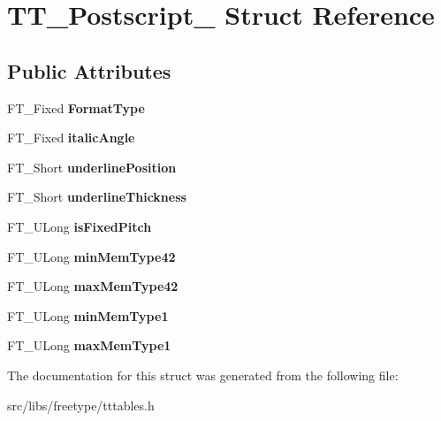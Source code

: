 \hypertarget{struct_t_t___postscript__}{
\section{TT\_\-Postscript\_\- Struct Reference}
\label{struct_t_t___postscript__}
}
\subsection*{Public Attributes}
\begin{DoxyCompactItemize}
\item 
\hypertarget{struct_t_t___postscript___a5ed6585c01fa4ffc3f8537d58bdd955f}{
FT\_\-Fixed {\bfseries FormatType}}
\label{struct_t_t___postscript___a5ed6585c01fa4ffc3f8537d58bdd955f}

\item 
\hypertarget{struct_t_t___postscript___adcca36c7fbcbdff00fc8c2884a215830}{
FT\_\-Fixed {\bfseries italicAngle}}
\label{struct_t_t___postscript___adcca36c7fbcbdff00fc8c2884a215830}

\item 
\hypertarget{struct_t_t___postscript___a909fd5064ab7547bb8ed984b5dfe2fe2}{
FT\_\-Short {\bfseries underlinePosition}}
\label{struct_t_t___postscript___a909fd5064ab7547bb8ed984b5dfe2fe2}

\item 
\hypertarget{struct_t_t___postscript___a4e4654766a4f27054c9a35958515e186}{
FT\_\-Short {\bfseries underlineThickness}}
\label{struct_t_t___postscript___a4e4654766a4f27054c9a35958515e186}

\item 
\hypertarget{struct_t_t___postscript___ab9a537994be4f81cb35f61f83cd97949}{
FT\_\-ULong {\bfseries isFixedPitch}}
\label{struct_t_t___postscript___ab9a537994be4f81cb35f61f83cd97949}

\item 
\hypertarget{struct_t_t___postscript___ad78af4931654c197d4a8d0f04d473885}{
FT\_\-ULong {\bfseries minMemType42}}
\label{struct_t_t___postscript___ad78af4931654c197d4a8d0f04d473885}

\item 
\hypertarget{struct_t_t___postscript___a70c4ba372d04e686208f0fede9885314}{
FT\_\-ULong {\bfseries maxMemType42}}
\label{struct_t_t___postscript___a70c4ba372d04e686208f0fede9885314}

\item 
\hypertarget{struct_t_t___postscript___a91a8b40f60e67a1920209e6b08355848}{
FT\_\-ULong {\bfseries minMemType1}}
\label{struct_t_t___postscript___a91a8b40f60e67a1920209e6b08355848}

\item 
\hypertarget{struct_t_t___postscript___a944a3df5127262db0f7ae92868defb99}{
FT\_\-ULong {\bfseries maxMemType1}}
\label{struct_t_t___postscript___a944a3df5127262db0f7ae92868defb99}

\end{DoxyCompactItemize}


The documentation for this struct was generated from the following file:\begin{DoxyCompactItemize}
\item 
src/libs/freetype/tttables.h\end{DoxyCompactItemize}
